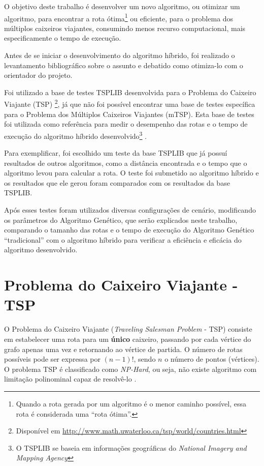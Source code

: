 \documentclass[12pt,openright,a4paper,twoside]{tcc}
\begin{document}
		O objetivo deste trabalho é desenvolver um novo algoritmo, ou otimizar um algoritmo, para encontrar a rota ótima\footnote{Quando a rota gerada por um algoritmo é o menor caminho possível, essa rota é considerada uma ``rota ótima''.} ou eficiente, para o problema dos múltiplos caixeiros viajantes, consumindo menos recurso computacional, mais especificamente o tempo de execução. 

		Antes de se iniciar o desenvolvimento do algoritmo híbrido, foi realizado o levantamento bibliográfico sobre o assunto e debatido como otimiza-lo com o orientador do projeto.

		Foi utilizado a base de testes TSPLIB desenvolvida para o Problema do Caixeiro Viajante (TSP) \footnote{Disponível em \url{http://www.math.uwaterloo.ca/tsp/world/countries.html}}, já que não foi possível encontrar uma base de testes específica para o Problema dos Múltiplos Caixeiros Viajantes (mTSP). Esta base de testes foi utilizada como referência para medir o desempenho das rotas e o tempo de execução do algoritmo híbrido desenvolvido\footnote{O TSPLIB se baseia em informações geográficas do \textit{National Imagery and Mapping Agency}} \cite{tsplib}.

		Para exemplificar, foi escolhido um teste da base TSPLIB que já possuí resultados de outros algoritmos, como a distância encontrada e o tempo que o algoritmo levou para calcular a rota. O teste foi submetido ao algoritmo híbrido e os resultados que ele gerou foram comparados com os resultados da base TSPLIB.

		Após esses testes foram utilizados diversas configurações de cenário, modificando os parâmetros do Algoritmo Genético, que serão explicados neste trabalho, comparando o tamanho das rotas e o tempo de execução do Algoritmo Genético ``tradicional'' com o algoritmo híbrido para verificar a eficiência e eficácia do algoritmo desenvolvido. 

	
	\chapter{Problema do Caixeiro Viajante - TSP}
		O Problema do Caixeiro Viajante (\textit{Traveling Salesman Problem} - TSP) consiste em estabelecer uma rota para um \textbf{único} caixeiro, passando por cada vértice do grafo apenas uma vez e retornando ao vértice de partida. O número de rotas possíveis pode ser expressa por $(n-1)!$, sendo $n$ o número de pontos (vértices).
		O problema TSP é classificado como \textit{NP-Hard}\cite{0015-pdf}, ou seja, não existe algoritmo com limitação polinominal capaz de resolvê-lo \cite{0010-pdf}. 
		
\end{document}
